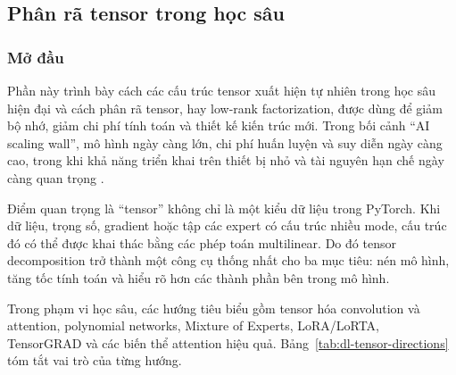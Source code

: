 \subsection{Phân rã tensor trong học sâu}
\makeatletter
{}
\makeatother

\subsubsection{Mở đầu}

Phần này trình bày cách các cấu trúc tensor xuất hiện tự nhiên trong học sâu hiện đại
và cách phân rã tensor, hay low-rank factorization, được dùng để giảm bộ nhớ, giảm
chi phí tính toán và thiết kế kiến trúc mới. Trong bối cảnh ``AI scaling wall'', mô
hình ngày càng lớn, chi phí huấn luyện và suy diễn ngày càng cao, trong khi khả năng
triển khai trên thiết bị nhỏ và tài nguyên hạn chế ngày càng quan trọng
\cite{chrysos2025tutorial}.

Điểm quan trọng là ``tensor'' không chỉ là một kiểu dữ liệu trong PyTorch. Khi dữ
liệu, trọng số, gradient hoặc tập các expert có cấu trúc nhiều mode, cấu trúc đó có
thể được khai thác bằng các phép toán multilinear.
Do đó tensor decomposition trở thành một công cụ thống nhất cho ba mục tiêu: nén mô
hình, tăng tốc tính toán và hiểu rõ hơn các thành phần bên trong mô hình.

Trong phạm vi học sâu, các hướng tiêu biểu gồm tensor hóa convolution và attention,
polynomial networks, Mixture of Experts, LoRA/LoRTA, TensorGRAD và các biến thể
attention hiệu quả. Bảng~\ref{tab:dl-tensor-directions} tóm tắt vai trò của từng
hướng.

